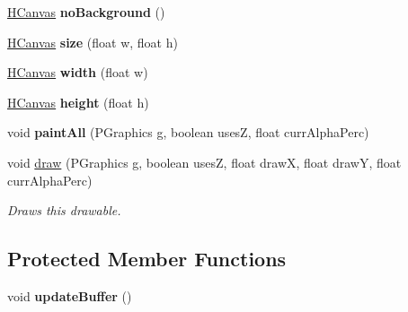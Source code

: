 \begin{DoxyCompactItemize}
\item 
\hypertarget{classhype_1_1drawable_1_1_h_canvas_aed8e13a4a6aba9c2ac70fd1366c90b18}{\hyperlink{classhype_1_1drawable_1_1_h_canvas}{H\-Canvas} {\bfseries no\-Background} ()}\label{classhype_1_1drawable_1_1_h_canvas_aed8e13a4a6aba9c2ac70fd1366c90b18}

\item 
\hypertarget{classhype_1_1drawable_1_1_h_canvas_aa23f93ad22eb3aea5810fc337411d310}{\hyperlink{classhype_1_1drawable_1_1_h_canvas}{H\-Canvas} {\bfseries size} (float w, float h)}\label{classhype_1_1drawable_1_1_h_canvas_aa23f93ad22eb3aea5810fc337411d310}

\item 
\hypertarget{classhype_1_1drawable_1_1_h_canvas_a3d44daed96f1b010848c73ee31f3a103}{\hyperlink{classhype_1_1drawable_1_1_h_canvas}{H\-Canvas} {\bfseries width} (float w)}\label{classhype_1_1drawable_1_1_h_canvas_a3d44daed96f1b010848c73ee31f3a103}

\item 
\hypertarget{classhype_1_1drawable_1_1_h_canvas_a5782a46d0b847bdd03f13034bddbcfbc}{\hyperlink{classhype_1_1drawable_1_1_h_canvas}{H\-Canvas} {\bfseries height} (float h)}\label{classhype_1_1drawable_1_1_h_canvas_a5782a46d0b847bdd03f13034bddbcfbc}

\item 
\hypertarget{classhype_1_1drawable_1_1_h_canvas_ab9c4170736dfd90149b29acd671ffd76}{void {\bfseries paint\-All} (P\-Graphics g, boolean uses\-Z, float curr\-Alpha\-Perc)}\label{classhype_1_1drawable_1_1_h_canvas_ab9c4170736dfd90149b29acd671ffd76}

\item 
void \hyperlink{classhype_1_1drawable_1_1_h_canvas_a1a0c59344a132623f8c6e999b2cf232a}{draw} (P\-Graphics g, boolean uses\-Z, float draw\-X, float draw\-Y, float curr\-Alpha\-Perc)
\begin{DoxyCompactList}\small\item\em Draws this drawable. \end{DoxyCompactList}\end{DoxyCompactItemize}
\subsection*{Protected Member Functions}
\begin{DoxyCompactItemize}
\item 
\hypertarget{classhype_1_1drawable_1_1_h_canvas_af03fa8512ff9955433a25e265929f6ae}{void {\bfseries update\-Buffer} ()}\label{classhype_1_1drawable_1_1_h_canvas_af03fa8512ff9955433a25e265929f6ae}

\end{DoxyCompactItemize}
